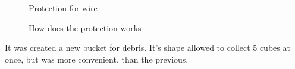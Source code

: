 \begin{figure}[H]
	\begin{minipage}[h]{0.47\linewidth}
		\caption{Protection for wire}
		\label{Shiftbuc2.13}
	\end{minipage}
	\hfill
	\begin{minipage}[h]{0.47\linewidth}
		\caption{How does the protection works}
		\label{Shiftbuc2.14}
	\end{minipage}
\end{figure}

It was created a new bucket for debris. It's shape allowed to collect 5 cubes at once, but was more convenient, than the previous.


